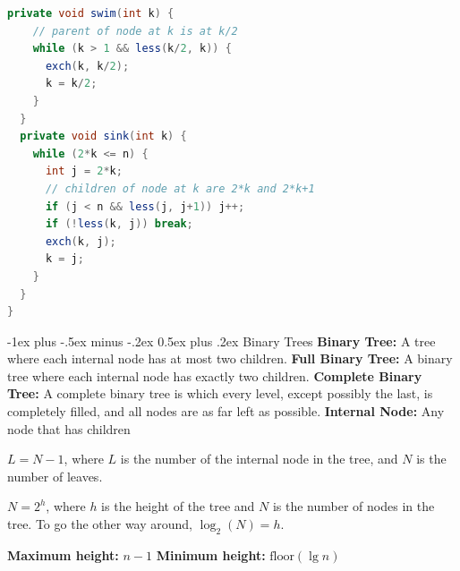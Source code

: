 \documentclass[letterpaper, 8pt]{extarticle}
\makeatletter
\renewcommand{\section}{\@startsection{section}{1}{0mm}%
                                {-1ex plus -.5ex minus -.2ex}%
                                {0.5ex plus .2ex}%
                                {\normalfont\normalsize\bfseries}}
\makeatother
\begin{document}
\begin{multicols*}{5}
\begin{lstlisting}[language=Java, breaklines=true, postbreak=\mbox{\textcolor{red}{$\hookrightarrow$}\space}]
  private void swim(int k) {
    // parent of node at k is at k/2
    while (k > 1 && less(k/2, k)) {
      exch(k, k/2);
      k = k/2;
    }
  }
  private void sink(int k) {
    while (2*k <= n) {
      int j = 2*k;
      // children of node at k are 2*k and 2*k+1
      if (j < n && less(j, j+1)) j++;
      if (!less(k, j)) break;
      exch(k, j);
      k = j;
    }
  }
}
  \end{lstlisting}

  \section{Binary Trees}
  \textbf{Binary Tree:} A tree where each internal node has at most two children.
  \textbf{Full Binary Tree:} A binary tree where each internal node has exactly two children.
  \textbf{Complete Binary Tree:} A complete binary tree is which every level,
  except possibly the last, is completely filled, and all nodes are as far left as possible.
  \textbf{Internal Node:} Any node that has children

  $L = N - 1$, where $L$ is the number of the internal node in the tree,
  and $N$ is the number of leaves.

  $N = 2^h$, where $h$ is the height of the tree and $N$ is the number of nodes in the tree.
  To go the other way around, $\log_2(N) = h$.

  \textbf{Maximum height:} $n - 1$
  \textbf{Minimum height:} $\text{floor}(\lg n)$


\end{multicols*}
\end{document}
